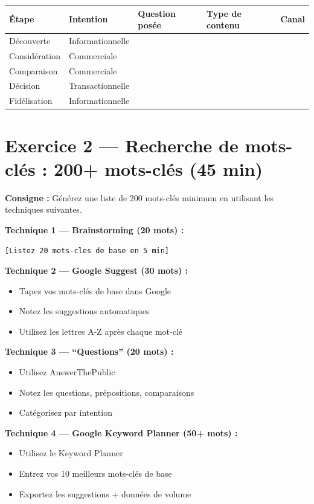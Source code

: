 \documentclass[12pt,a4paper]{report}
\begin{document}
\begin{tabular}{|l|l|l|l|l|}
\hline
\textbf{Étape} & \textbf{Intention} & \textbf{Question posée} & \textbf{Type de contenu} & \textbf{Canal} \\
\hline
Découverte & Informationnelle & & & \\
\hline
Considération & Commerciale & & & \\
\hline
Comparaison & Commerciale & & & \\
\hline
Décision & Transactionnelle & & & \\
\hline
Fidélisation & Informationnelle & & & \\
\hline
\end{tabular}

\section{Exercice 2 --- Recherche de mots-clés : 200+ mots-clés (45 min)}

\textbf{Consigne :} Générez une liste de 200 mots-clés minimum en utilisant les techniques suivantes.

\textbf{Technique 1 --- Brainstorming (20 mots) :}
\begin{lstlisting}
[Listez 20 mots-cles de base en 5 min]
\end{lstlisting}

\textbf{Technique 2 --- Google Suggest (30 mots) :}
\begin{itemize}
\item Tapez vos mots-clés de base dans Google
\item Notez les suggestions automatiques
\item Utilisez les lettres A-Z après chaque mot-clé
\end{itemize}

\textbf{Technique 3 --- ``Questions'' (20 mots) :}
\begin{itemize}
\item Utilisez AnswerThePublic
\item Notez les questions, prépositions, comparaisons
\item Catégorisez par intention
\end{itemize}

\textbf{Technique 4 --- Google Keyword Planner (50+ mots) :}
\begin{itemize}
\item Utilisez le Keyword Planner
\item Entrez vos 10 meilleurs mots-clés de base
\item Exportez les suggestions + données de volume
\end{itemize}
\end{document}
